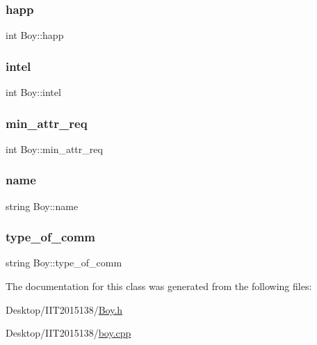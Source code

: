 \subsubsection{\texorpdfstring{happ}{happ}}
{\footnotesize\ttfamily int Boy\+::happ\hspace{0.3cm}{\ttfamily [private]}}

\mbox{\label{classBoy_ad2389f3dd5b9566a31041caa93981b80}} 
\subsubsection{\texorpdfstring{intel}{intel}}
{\footnotesize\ttfamily int Boy\+::intel\hspace{0.3cm}{\ttfamily [private]}}

\mbox{\label{classBoy_a3a826898118d324168a211c00bacd841}} 
\subsubsection{\texorpdfstring{min\+\_\+attr\+\_\+req}{min\_attr\_req}}
{\footnotesize\ttfamily int Boy\+::min\+\_\+attr\+\_\+req\hspace{0.3cm}{\ttfamily [private]}}

\mbox{\label{classBoy_a8649f275f6428267fad0234866c1ccfa}} 
\subsubsection{\texorpdfstring{name}{name}}
{\footnotesize\ttfamily string Boy\+::name\hspace{0.3cm}{\ttfamily [private]}}

\mbox{\label{classBoy_a4261d361dff9bee8b709f214e1f492dd}} 
\subsubsection{\texorpdfstring{type\+\_\+of\+\_\+comm}{type\_of\_comm}}
{\footnotesize\ttfamily string Boy\+::type\+\_\+of\+\_\+comm\hspace{0.3cm}{\ttfamily [private]}}



The documentation for this class was generated from the following files\+:\begin{DoxyCompactItemize}
\item 
Desktop/\+I\+I\+T2015138/\hyperlink{Boy_8h}{Boy.\+h}\item 
Desktop/\+I\+I\+T2015138/\hyperlink{boy_8cpp}{boy.\+cpp}\end{DoxyCompactItemize}
